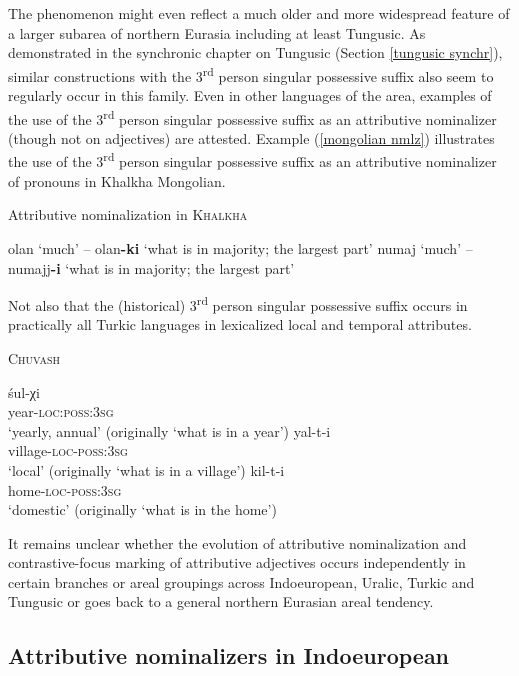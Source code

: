 The phenomenon might even reflect a much older and more widespread feature of a larger subarea of northern Eurasia including at least Tungusic. As demonstrated in the synchronic chapter on Tungusic (Section \ref{tungusic synchr}), similar constructions with the 3\textsuperscript{rd} person singular possessive suffix also seem to regularly occur in this family. Even in other languages of the area, examples of the use of the 3\textsuperscript{rd} person singular possessive suffix as an attributive nominalizer (though not on adjectives) are attested. Example (\ref{mongolian nmlz}) illustrates the use of the 3\textsuperscript{rd} person singular possessive suffix as an attributive nominalizer of pronouns in Khalkha Mongolian.
\begin{exe}
\ex Attributive nominalization in \textsc{Khalkha} \citep[6]{pavlov1985}\label{mongolian nmlz}
\begin{xlist}
\ex	olan ‘much’ – olan\textbf{-ki} ‘what is in majority; the largest part’
\ex	numaj ‘much’ – numajj\textbf{-i} ‘what is in majority; the largest part’
\end{xlist}
\end{exe}
Not also that the (historical) 3\textsuperscript{rd} person singular possessive suffix occurs in practically all Turkic languages in lexicalized local and temporal attributes. 
\begin{exe}
\ex \textsc{Chuvash} \citep[67-68]{benzing1963}
\begin{xlist}
\ex
\gll	śul-χi\\
	year-\textsc{loc:poss:3sg}\\
\glt	‘yearly, annual’ (originally ‘what is in a year’)
\ex
\gll	yal-t-i\\
	village-\textsc{loc-poss:3sg}\\
\glt	‘local’ (originally ‘what is in a village’)
\ex
\gll	kil-t-i\\
	home-\textsc{loc-poss:3sg}\\
\glt	‘domestic’ (originally ‘what is in the home’)
\end{xlist}
\end{exe}
It remains unclear whether the evolution of attributive nominalization and contrastive-focus marking of attributive adjectives occurs independently in certain branches or areal groupings across Indoeuropean, Uralic, Turkic and Tungusic or goes back to a general northern Eurasian areal tendency.

\subsection{Attributive nominalizers in Indoeuropean} \label{ie diachr}

